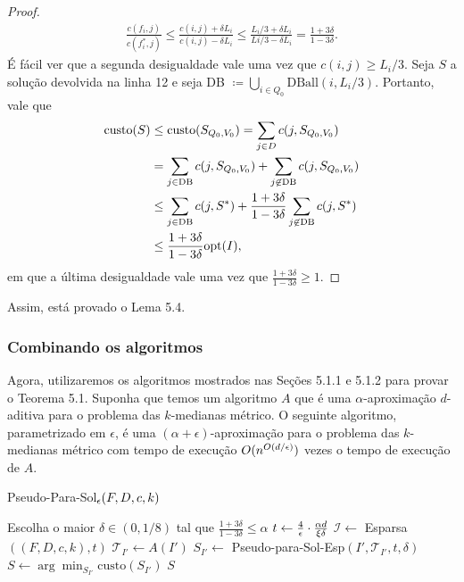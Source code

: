 \begin{proof}
        \begin{subequations}
            \begin{align*}
                \frac{c(f_i,j)}{c(f_i^*,j)} \leq \frac{c(i,j) + \delta L_i}{c(i,j) - \delta L_i} \leq \frac{L_i/3 + \delta L_i}{Li/3 - \delta L_i} = \frac{1 +3\delta}{1 - 3\delta}.
            \end{align*}
        \end{subequations}
        É fácil ver que a segunda desigualdade vale uma vez que $c(i,j) \geq L_i/3$. Seja $S$ a solução devolvida na linha 12 e seja DB $\coloneqq\bigcup_{i \in Q_0} \text{DBall}(i,L_i/3)$. Portanto, vale que
        \begin{subequations}
            \begin{align*}
                \text{custo}(S) &\leq \text{custo}(S_{Q_0,V_0}) = \sum_{j \in D} c(j,S_{Q_0,V_0}) \\
                &= \sum_{j \in \text{DB}} c(j,S_{Q_0,V_0}) + \sum_{j \not \in \text{DB}} c(j,S_{Q_0,V_0}) \\
                &\leq \sum_{j \in \text{DB}} c(j, S^*) + \frac{1 +3\delta}{1 - 3\delta} \sum_{j \not \in \text{DB}}  c(j,S^*)\\
                &\leq  \frac{1 +3\delta}{1 - 3\delta} \mathrm{opt}(I),
            \end{align*}
        \end{subequations}
            em que a última desigualdade vale uma vez que $\frac{1 +3\delta}{1 - 3\delta} \geq 1$.
\end{proof}

Assim, está provado o Lema 5.4.

\subsubsection{Combinando os algoritmos}

Agora, utilizaremos os algoritmos mostrados nas Seções 5.1.1 e 5.1.2 para provar o Teorema 5.1. Suponha que temos um algoritmo $A$ que é uma $\alpha$-aproximação $d$-aditiva para o problema das $k$-medianas métrico. O seguinte algoritmo, parametrizado em $\epsilon$, é uma $(\alpha + \epsilon)$-aproximação para o problema das $k$-medianas métrico com tempo de execução $O(n^{O(d/\epsilon)})$ vezes o tempo de execução de $A$.

\begin{algorithm}
    \caption{\sc Pseudo-Para-Sol$_\epsilon(F,D,c,k)$}
    \begin{algorithmic}[1]
        \State Escolha o maior $\delta \in (0,1/8)$ tal que $\frac{1+3\delta}{1-3\delta} \leq \alpha$
        \State $ t \gets \frac{4}{\epsilon} \cdot \frac{\alpha d}{\xi \delta}$
        \State $\mathcal{I} \gets$ {\sc Esparsa}$((F,D,c,k),t)$
        \State $\mathcal{T}_{I'} \gets A(I')$
        \State $S_{I'} \gets $ {\sc Pseudo-para-Sol-Esp}$(I', \mathcal{T}_{I'},t,\delta)$
        \EndFor
        \State $S \gets \arg\min_{S_{I'}} \text{custo}(S_{I'})$
        \State \Return $S$
    \end{algorithmic}
\end{algorithm}

